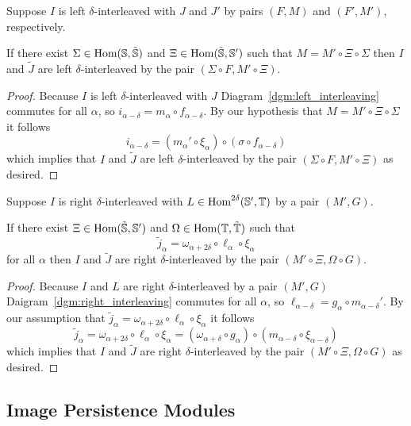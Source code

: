 \begin{lemma}\label{lem:left}
  Suppose $I$ is left $\delta$-interleaved with $J$ and $J'$ by pairs $(F, M)$ and $(F', M')$, respectively.

  If there exist $\Sigma\in\text{Hom}(\mathbb{S},\tilde{\mathbb{S}})$ and $\Xi\in\text{Hom}(\tilde{\mathbb{S}}, \mathbb{S}')$ such that $M = M'\circ\Xi\circ\Sigma$ then $I$ and $\tilde{J}$ are left $\delta$-interleaved by the pair $(\Sigma\circ F, M'\circ\Xi)$.
\end{lemma}
\begin{proof}
  Because $I$ is left $\delta$-interleaved with $J$ Diagram~\ref{dgm:left_interleaving} commutes for all $\alpha$, so $i_{\alpha-\delta} = m_\alpha\circ f_{\alpha-\delta}$.
  By our hypothesis that $M = M'\circ\Xi\circ\Sigma$ it follows
  \[ i_{\alpha-\delta} = (m_\alpha'\circ\xi_\alpha)\circ(\sigma\circ f_{\alpha-\delta}) \]
  which implies that $I$ and $\tilde{J}$ are left $\delta$-interleaved by the pair $(\Sigma\circ F, M'\circ\Xi)$ as desired.
\end{proof}

\begin{lemma}\label{lem:right}
  Suppose $I$ is right $\delta$-interleaved with $L\in\text{Hom}^{2\delta}(\mathbb{S}',\mathbb{T})$ by a pair $(M', G)$.

  If there exist $\Xi\in\text{Hom}(\tilde{\mathbb{S}},\mathbb{S}')$ and $\Omega\in\text{Hom}(\mathbb{T},\tilde{\mathbb{T}})$ such that
  \[\tilde{j}_\alpha = \omega_{\alpha+2\delta}\circ \ell_\alpha\circ\xi_\alpha \]
  for all $\alpha$ then $I$ and $\tilde{J}$ are right $\delta$-interleaved by the pair $(M'\circ\Xi, \Omega\circ G)$.
\end{lemma}
\begin{proof}
  Because $I$ and $L$ are right $\delta$-interleaved by a pair $(M', G)$ Daigram~\ref{dgm:right_interleaving} commutes for all $\alpha$, so $\ell_{\alpha-\delta} = g_\alpha\circ m_{\alpha-\delta}'$.
  By our assumption that $\tilde{j}_\alpha = \omega_{\alpha+2\delta}\circ \ell_\alpha\circ\xi_\alpha$ it follows
  \[ \tilde{j}_\alpha = \omega_{\alpha+2\delta}\circ \ell_\alpha\circ\xi_\alpha = (\omega_{\alpha+\delta}\circ g_\alpha)\circ (m_{\alpha-\delta}\circ\xi_{\alpha-\delta}) \]
  which implies that $I$ and $\tilde{J}$ are right $\delta$-interleaved by the pair $(M'\circ \Xi, \Omega\circ G)$ as desired.
\end{proof}

\subsection{Image Persistence Modules}

